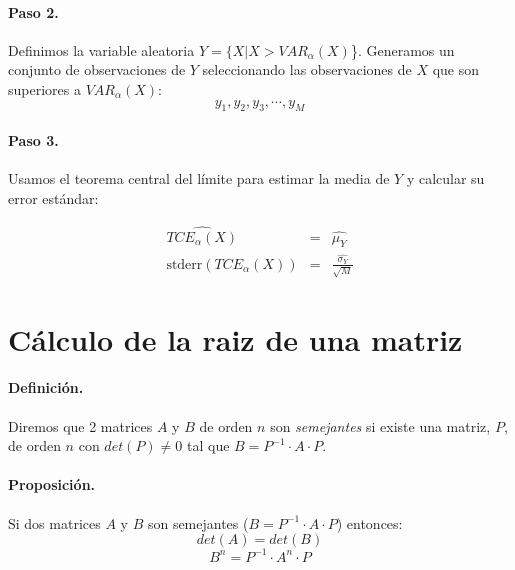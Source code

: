 \paragraph{Paso 2.} Definimos la variable aleatoria $Y = \{X|X > VAR_{\alpha}(X)$\}.
Generamos un conjunto de observaciones de $Y$ seleccionando las observaciones de $X$
que son superiores a $VAR_{\alpha}(X)$:
\begin{displaymath}
y_1, y_2, y_3, \cdots, y_M
\end{displaymath}

\paragraph{Paso 3.} Usamos el teorema central del l\'imite para estimar la media
de $Y$ y calcular su error est\'andar:

\begin{eqnarray}
\widehat{TCE_{\alpha}(X)} & = & \widehat{\mu_Y} \nonumber \\
\textrm{stderr}(TCE_\alpha(X)) & = & \frac{\widehat{\sigma_Y}}{\sqrt{M}} \nonumber
\end{eqnarray}


\section{C\'alculo de la raiz de una matriz}
\label{apendix:sqrtmat}

\paragraph{Definici\'on.}
Diremos que 2 matrices $A$ y $B$ de orden $n$ son \emph{semejantes}
 si existe una matriz, $P$, de orden $n$ con
$det(P) \neq 0$ tal que $B = P^{-1} \cdot A \cdot P$.


\paragraph{Proposici\'on.} Si dos matrices $A$ y $B$ son semejantes 
($B = P^{-1} \cdot A \cdot P$) entonces:
\begin{displaymath}
det(A) = det(B)
\end{displaymath}
\begin{displaymath}
B^n = P^{-1} \cdot A^{n} \cdot P
\end{displaymath}

